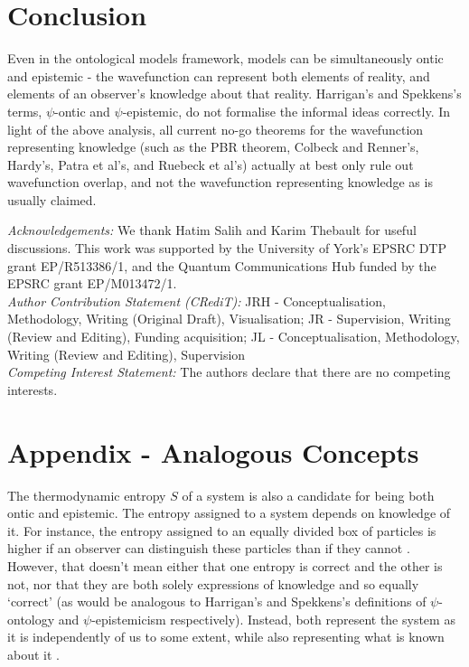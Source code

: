 \documentclass[superscriptaddress, floatfix,nofootinbib,12pt]{revtex4-2}
\begin{document}
\section{Conclusion}

Even in the ontological models framework, models can be simultaneously ontic and epistemic - the wavefunction can represent both elements of reality, and elements of an observer's knowledge about that reality. Harrigan's and Spekkens's terms, $\psi$-ontic and $\psi$-epistemic, do not formalise the informal ideas correctly. In light of the above analysis, all current no-go theorems for the wavefunction representing knowledge (such as the PBR theorem, Colbeck and Renner's, Hardy's, Patra et al's, and Ruebeck  et al's) actually at best only rule out wavefunction overlap, and not the wavefunction representing knowledge as is usually claimed.

\begin{acknowledgements} \textit{Acknowledgements:} We thank Hatim Salih and Karim Thebault for useful discussions. This work was supported by the University of York's EPSRC DTP grant EP/R513386/1, and the Quantum Communications Hub funded by the EPSRC grant EP/M013472/1.\\
\textit{Author Contribution Statement (CRediT):} JRH - Conceptualisation, Methodology, Writing (Original Draft), Visualisation; JR - Supervision, Writing (Review and Editing), Funding acquisition; JL - Conceptualisation, Methodology, Writing (Review and Editing), Supervision\\
\textit{Competing Interest Statement:} The authors declare that there are no competing interests.
\end{acknowledgements}




\appendix
\section{Appendix - Analogous Concepts}
The thermodynamic entropy $S$ of a system is also a candidate for being both ontic and epistemic. The entropy assigned to a system depends on knowledge of it. For instance, the entropy assigned to an equally divided box of particles is higher if an observer can distinguish these particles than if they cannot \cite{Cheng2009Thermodynamics}. However, that doesn't mean either that one entropy is correct and the other is not, nor that they are both solely expressions of knowledge and so equally `correct' (as would be analogous to Harrigan's and Spekkens's definitions of $\psi$-ontology and $\psi$-epistemicism respectively). Instead, both represent the system as it is independently of us to some extent, while also representing what is known about it \cite{Ladyman2008UseofITEntropy}.
\end{document}
